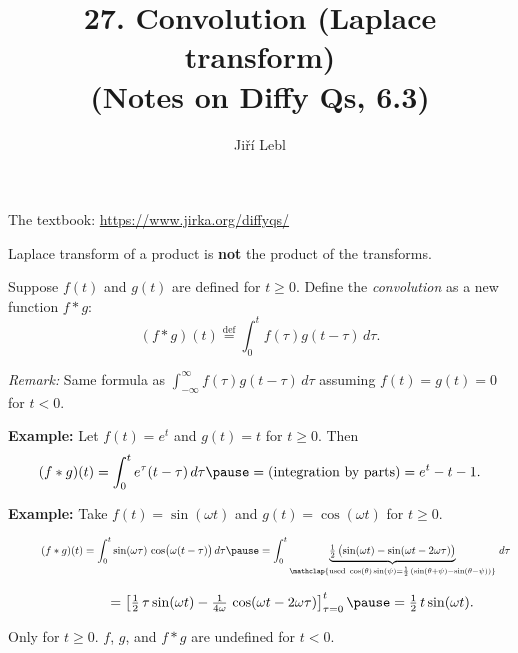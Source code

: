 \documentclass[10pt,aspectratio=169]{beamer}
\author{Ji\v{r}\'i Lebl}
\institute[OSU]{%
Oklahoma State University%
}
\title{27. Convolution (Laplace transform)\\(Notes on Diffy Qs, 6.3)}
\date{}
\begin{document}
\begin{frame}
\titlepage


\begin{center}
The textbook: \url{https://www.jirka.org/diffyqs/}
\end{center}
\end{frame}

\begin{frame}
Laplace transform of a product is \textbf{not} the product of the transforms.

\medskip
\pause

Suppose $f(t)$ and $g(t)$ are defined for $t \geq 0$.  Define
the \emph{convolution} as a new function $f * g$:
\[
(f * g)(t) \overset{\text{def}}{=}
\int_0^t f(\tau) g(t-\tau) \, d\tau .
\]

\pause

\emph{Remark:}  Same formula as
$\int_{-\infty}^\infty f(\tau) g(t-\tau) \, d\tau$
assuming $f(t)=g(t)=0$ for $t < 0$.

\medskip
\pause

\textbf{Example:}
Let $f(t) = e^t$ and $g(t) = t$ for $t \geq 0$.  Then 
\[
(f*g)(t)
=
\int_0^t e^\tau (t-\tau) \, d\tau
\pause
=
\text{(integration by parts)}
=
e^t - t - 1 .
\]

\pause

\textbf{Example:}
Take $f(t) = \sin (\omega t)$ and $g(t) = \cos (\omega t)$ for $t \geq 0$.

\smallskip

$\displaystyle
\quad\qquad
(f*g)(t)
=
\int_0^t  \sin ( \omega \tau ) \,
\cos \bigl( \omega (t-\tau) \bigr) \, d\tau
\pause
=
\int_0^t
\underbrace{
\tfrac{1}{2} \, \bigl( \sin (\omega t) - \sin (\omega t - 2 \omega \tau
) \bigr)
}_{\mathclap{\text{used } \cos (\theta) \sin (\psi) =
\frac{1}{2} \, \left( \sin (\theta + \psi) - \sin (\theta - \psi) \right)}}
\, d\tau
$

\medskip
\pause

$\displaystyle
\quad\qquad
\phantom{(f*g)(t)}
{} =
\left[ \tfrac{1}{2} \, \tau  \sin (\omega t) - \tfrac{1}{4\omega} \, \cos (\omega t -
2 \omega \tau) \right]_{\tau=0}^t
\pause
= \tfrac{1}{2} \, t \sin (\omega t) .
$

\medskip
\pause

Only for $t \geq 0$. \quad  $f$, $g$, and $f*g$ are undefined for $t < 0$.

\end{frame}
\end{document}
